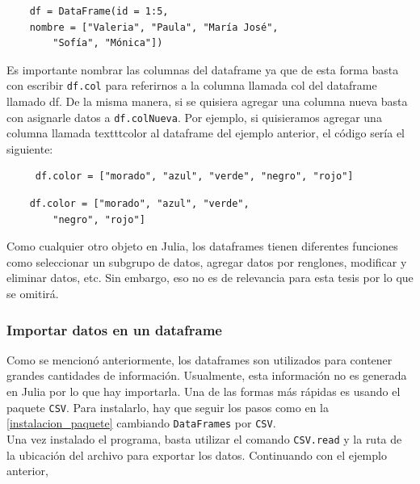 \begin{tcolorbox}
    \begin{verbatim}
    df = DataFrame(id = 1:5, 
    nombre = ["Valeria", "Paula", "María José", 
        "Sofía", "Mónica"])
    \end{verbatim}
\end{tcolorbox}



Es importante nombrar las columnas del dataframe ya que de esta forma basta con escribir \texttt{df.col} para referirnos a la columna llamada col del dataframe llamado df. De la misma manera, si se quisiera agregar una columna nueva basta con asignarle datos a \texttt{df.colNueva}. Por ejemplo, si quisieramos agregar una columna llamada texttt{color} al dataframe del ejemplo anterior, el código sería el siguiente: 

\begin{verbatim}
     df.color = ["morado", "azul", "verde", "negro", "rojo"]
\end{verbatim}

\begin{tcolorbox}
    \begin{verbatim}
    df.color = ["morado", "azul", "verde", 
        "negro", "rojo"]
    \end{verbatim}
\end{tcolorbox}


Como cualquier otro objeto en Julia, los dataframes tienen diferentes funciones como seleccionar un subgrupo de datos, agregar datos por renglones, modificar y eliminar datos, etc. Sin embargo, eso no es de relevancia para esta tesis por lo que se omitirá. 

\subsubsection{Importar datos en un dataframe}

Como se mencionó anteriormente, los dataframes son utilizados para contener grandes cantidades de información. Usualmente, esta información no es generada en Julia por lo que hay importarla. Una de las formas más rápidas es usando el paquete \texttt{CSV}. Para instalarlo, hay que seguir los pasos como en la  \ref{instalacion_paquete} cambiando \texttt{DataFrames} por \texttt{CSV}. 
\\
Una vez instalado el programa, basta utilizar el comando \texttt{CSV.read} y la ruta de la ubicación del archivo para exportar los datos. Continuando con el ejemplo anterior, 


